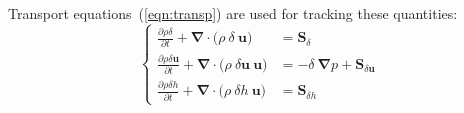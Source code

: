     Transport equations~(\ref{eqn:transp}) are used for tracking these quantities:
    \begin{equation}
        \begin{cases}
            \frac{\partial \rho \delta}{\partial t}  + \boldsymbol{\nabla} \cdot \big( \rho \ \delta \ \boldsymbol{u} \big) & = \boldsymbol{S}_{\delta} \\ 
            \frac{\partial \rho \delta \boldsymbol{u} }{\partial t}  + \boldsymbol{\nabla} \cdot \big( \rho \ \delta \boldsymbol{u} \ \boldsymbol{u} \big) & = - \delta \ \boldsymbol{\nabla} p + \boldsymbol{S}_{\delta \boldsymbol{u}} \\ 
            \frac{\partial \rho \delta h }{\partial t}  + \boldsymbol{\nabla} \cdot \big( \rho \ \delta h \ \boldsymbol{u} \big) & = \boldsymbol{S}_{\delta h}
        \end{cases} \label{eqn:transp}
    \end{equation}
